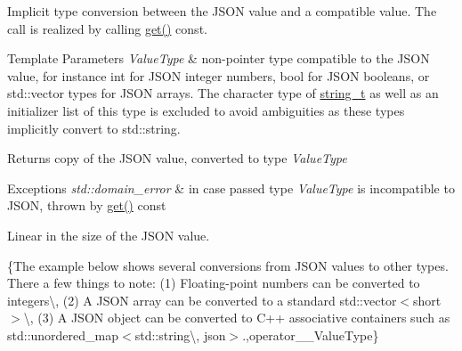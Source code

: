 Implicit type conversion between the J\-S\-O\-N value and a compatible value. The call is realized by calling \hyperlink{classnlohmann_1_1basic__json_ac5693cff1df0775cd3fbe960412cde4b}{get()} const.


\begin{DoxyTemplParams}{Template Parameters}
{\em Value\-Type} & non-\/pointer type compatible to the J\-S\-O\-N value, for instance {\ttfamily int} for J\-S\-O\-N integer numbers, {\ttfamily bool} for J\-S\-O\-N booleans, or {\ttfamily std\-::vector} types for J\-S\-O\-N arrays. The character type of \hyperlink{classnlohmann_1_1basic__json_ab63e618bbb0371042b1bec17f5891f42}{string\-\_\-t} as well as an initializer list of this type is excluded to avoid ambiguities as these types implicitly convert to {\ttfamily std\-::string}.\\
\hline
\end{DoxyTemplParams}
\begin{DoxyReturn}{Returns}
copy of the J\-S\-O\-N value, converted to type {\itshape Value\-Type} 
\end{DoxyReturn}

\begin{DoxyExceptions}{Exceptions}
{\em std\-::domain\-\_\-error} & in case passed type {\itshape Value\-Type} is incompatible to J\-S\-O\-N, thrown by \hyperlink{classnlohmann_1_1basic__json_ac5693cff1df0775cd3fbe960412cde4b}{get()} const\\
\hline
\end{DoxyExceptions}
Linear in the size of the J\-S\-O\-N value.

\{The example below shows several conversions from J\-S\-O\-N values to other types. There a few things to note\-: (1) Floating-\/point numbers can be converted to integers\textbackslash{}, (2) A J\-S\-O\-N array can be converted to a standard {\ttfamily std\-::vector$<$short$>$}\textbackslash{}, (3) A J\-S\-O\-N object can be converted to C++ associative containers such as {\ttfamily std\-::unordered\-\_\-map$<$std\-::string\textbackslash{}, json$>$}.,operator\-\_\-\-\_\-\-Value\-Type\}

